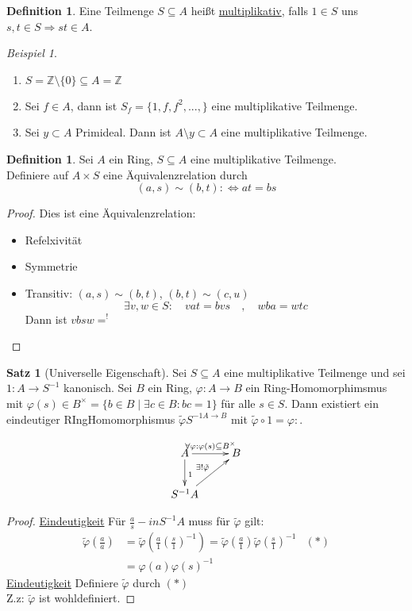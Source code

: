 \documentclass[10pt,a4paper]{article}
\newcommand{\Z}{\ensuremath{\mathbb{Z}}}
\newcounter{thm}[section]
\theoremstyle{definition}
\newtheorem{definition}[thm]{Definition}
\newtheorem{satz}[thm]{Satz}
\theoremstyle{plain}
\theoremstyle{remark}
\newtheorem{exm}[thm]{Beispiel}
\begin{document}
\begin{definition}
	Eine Teilmenge $S\subseteq A$ heißt \underline{multiplikativ}, falls $1\in S$ uns $s,t\in S\Rightarrow st\in A$.
\end{definition}
\begin{exm}
	\begin{enumerate}
		\item $S=\Z\setminus \{0\}\subseteq A=\Z$
		\item Sei $f\in A$, dann ist $S_f=\{1,f,f^2,...,\}$ eine multiplikative Teilmenge.
		\item Sei $y\subset A$ Primideal. Dann ist $A\setminus y\subset A$ eine multiplikative Teilmenge.
	\end{enumerate}
\end{exm}
\begin{definition}
	Sei $A$ ein Ring, $S\subseteq A$ eine multiplikative Teilmenge.\\
	Definiere auf $A\times S$ eine Äquivalenzrelation durch
	\[(a,s)\sim (b,t):\Leftrightarrow at=bs\]
\end{definition}
\begin{proof}
	Dies ist eine Äquivalenzrelation:\begin{itemize}
		\item Refelxivität
		\item Symmetrie
		\item Transitiv: $(a,s)\sim (b,t)$, $(b,t)\sim (c,u)$
		\[\exists v,w\in S:\quad vat=bvs\quad,\quad wba=wtc\]
		Dann ist $vbsw=^!$ %
	\end{itemize}
\end{proof}
\begin{satz}[Universelle Eigenschaft]
	Sei $S\subseteq A$ eine multiplikative Teilmenge und sei $1:A\rightarrow S^{-1}$ kanonisch. Sei $B$ ein Ring, $\varphi:A\rightarrow B$ ein Ring-Homomorphimsmus mit $\varphi(s)\in B^\times=\{b\in B\mid  \exists c\in B: bc=1\}$ für alle $s\in S$. Dann existiert ein eindeutiger RIngHomomorphismus $\tilde{\varphi}S^{-1 A\rightarrow B}$ mit $\tilde{\varphi}\circ 1=\varphi:$.
	
	\[\xymatrix{
		 A\ar[r]^{\forall\varphi:\varphi(s)\subseteq B^\times}\ar[d]^{1}&B\\
		S^{-1}A\ar[ru]^{\exists!\tilde\varphi}&
	}\]
\end{satz}
\begin{proof}
	\underline{Eindeutigkeit} Für $\frac{a}{s}-in S^{-1}A$ muss für $\tilde{\varphi}$ gilt:
	\begin{align*}
	\tilde\varphi\left(\frac{a}{a}\right)&=\tilde{\varphi}\left(\frac{a}{1}\left(\frac{s}{1}\right)^{-1}\right)=\tilde{\varphi}\left(\frac{a}{1}\right)\tilde{\varphi}\left(\frac{s}{1}\right)^{-1}&(*)\\
	&=\varphi(a)\varphi(s)^{-1}
	\end{align*}
	\underline{Eindeutigkeit}
	Definiere $\tilde\varphi$ durch $(*)$\\
	Z.z: $\tilde\varphi$ ist wohldefiniert.
\end{proof}
\end{document}
